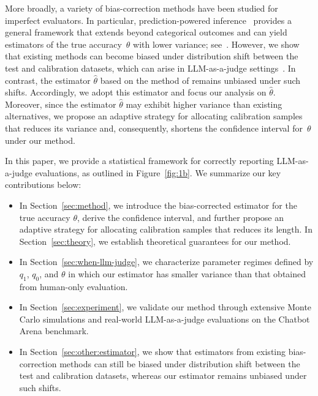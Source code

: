 More broadly, a variety of bias-correction methods have been studied for imperfect evaluators. In particular, prediction-powered inference~\citep{angelopoulos2023prediction, angelopoulos2023ppi++} provides a general framework that extends beyond categorical outcomes and can yield estimators of the true accuracy~$\theta$ with lower variance; see~\citet{kloos2021comparing, chen2026efficient}. However, we show that existing methods can become biased under distribution shift between the test and calibration datasets, which can arise in LLM-as-a-judge settings~\citep{jung2024trust}. In contrast, the estimator $\hat{\theta}$ based on the method of \citet{rogan1978estimating} remains unbiased under such shifts. Accordingly, we adopt this estimator and focus our analysis on $\hat{\theta}$. Moreover, since the estimator $\hat{\theta}$ may exhibit higher variance than existing alternatives, we propose an adaptive strategy for allocating calibration samples that reduces its variance and, consequently, shortens the confidence interval for~$\theta$ under our method.



In this paper, we provide a statistical framework for correctly reporting LLM-as-a-judge evaluations, as outlined in Figure~\ref{fig:1b}. We summarize our key contributions below:
\begin{itemize}[leftmargin=*, itemsep=0pt, topsep=0pt, partopsep=0pt]
    \item
    In Section~\ref{sec:method}, we introduce the bias-corrected estimator for the true accuracy $\theta$, derive the confidence interval, and further propose an adaptive strategy for allocating calibration samples that reduces its length. In Section~\ref{sec:theory}, we establish theoretical guarantees for our method.
    \item
    In Section~\ref{sec:when-llm-judge}, we characterize parameter regimes defined by $q_1$, $q_0$, and $\theta$ in which our estimator has smaller variance than that obtained from human-only evaluation.
    \item 
    In Section~\ref{sec:experiment}, we validate our method through extensive Monte Carlo simulations and real-world LLM-as-a-judge evaluations on the Chatbot Arena benchmark.
    \item
    In Section~\ref{sec:other:estimator}, we show that estimators from existing bias-correction methods can still be biased under distribution shift between the test and calibration datasets, whereas our estimator remains unbiased under such shifts.
\end{itemize}
\vspace{-4pt}